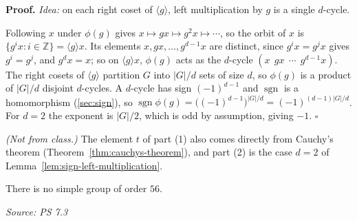 \documentclass[11pt]{report}
\renewenvironment{proof}[1][Proof]{\noindent\textbf{#1.} }{\hfill$\square$\par\vspace{5pt}}
\newcommand{\srcline}[1]{\par\hfill{\footnotesize\textit{Source: #1}}}
\begin{document}
\begin{proof}
\textit{Idea:} on each right coset of $\langle g \rangle$, left multiplication by $g$ is a single $d$-cycle.\par
Following $x$ under $\phi(g)$ gives $x \mapsto gx \mapsto g^2x \mapsto \cdots$, so the orbit of $x$ is $\{g^ix : i \in \mathbb{Z}\} = \langle g \rangle x$. Its elements $x, gx, \ldots, g^{d-1}x$ are distinct, since $g^ix = g^jx$ gives $g^i = g^j$, and $g^dx = x$; so on $\langle g \rangle x$, $\phi(g)$ acts as the $d$-cycle $(x\ \ gx\ \ \cdots\ \ g^{d-1}x)$. The right cosets of $\langle g \rangle$ partition $G$ into $|G|/d$ sets of size $d$, so $\phi(g)$ is a product of $|G|/d$ disjoint $d$-cycles. A $d$-cycle has sign $(-1)^{d-1}$ and $\operatorname{sgn}$ is a homomorphism (\ref{sec:sign}), so $\operatorname{sgn}\phi(g) = \big((-1)^{d-1}\big)^{|G|/d} = (-1)^{(d-1)|G|/d}$. For $d = 2$ the exponent is $|G|/2$, which is odd by assumption, giving $-1$.
\end{proof}

\begin{rembox}\label{rem:order-2-mod-4-index-two}
\textit{(Not from class.)} The element $t$ of part (1) also comes directly from Cauchy's theorem (Theorem~\ref{thm:cauchys-theorem}), and part (2) is the case $d = 2$ of Lemma~\ref{lem:sign-left-multiplication}.
\end{rembox}

\begin{propbox}\label{prop:no-simple-56}
There is no simple group of order $56$.
\srcline{PS 7.3}
\end{propbox}
\end{document}
